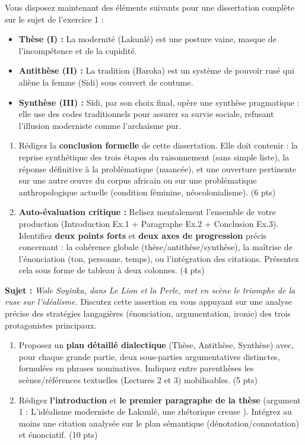 \documentclass[11pt]{article}
\begin{document}
\begin{exercice}
Vous disposez maintenant des éléments suivants pour une dissertation complète sur le sujet de l'exercice 1 :
\begin{itemize}
    \item \textbf{Thèse (I) :} La modernité (Lakunlé) est une posture vaine, masque de l'incompétence et de la cupidité.
    \item \textbf{Antithèse (II) :} La tradition (Baroka) est un système de pouvoir rusé qui aliène la femme (Sidi) sous couvert de coutume.
    \item \textbf{Synthèse (III) :} Sidi, par son choix final, opère une synthèse pragmatique : elle use des codes traditionnels pour assurer sa survie sociale, refusant l'illusion moderniste comme l'archaïsme pur.
\end{itemize}

\begin{enumerate}
    \item Rédigez la \textbf{conclusion formelle} de cette dissertation. Elle doit contenir : la reprise synthétique des trois étapes du raisonnement (sans simple liste), la réponse définitive à la problématique (nuancée), et une ouverture pertinente sur une autre œuvre du corpus africain ou sur une problématique anthropologique actuelle (condition féminine, néocolonialisme). (6 pts)
    \item \textbf{Auto-évaluation critique :} Relisez mentalement l'ensemble de votre production (Introduction Ex.1 + Paragraphe Ex.2 + Conclusion Ex.3). Identifiez \textbf{deux points forts} et \textbf{deux axes de progression} précis concernant : la cohérence globale (thèse/antithèse/synthèse), la maîtrise de l'énonciation (ton, personne, temps), ou l'intégration des citations. Présentez cela sous forme de tableau à deux colonnes. (4 pts)
\end{enumerate}
\end{exercice}

\begin{exercice}
\textbf{Sujet :} \og \textit{Wole Soyinka, dans Le Lion et la Perle, met en scène le triomphe de la ruse sur l'idéalisme.} \fg{} Discutez cette assertion en vous appuyant sur une analyse précise des stratégies langagières (énonciation, argumentation, ironie) des trois protagonistes principaux.

\begin{enumerate}
    \item Proposez un \textbf{plan détaillé dialectique} (Thèse, Antithèse, Synthèse) avec, pour chaque grande partie, deux sous-parties argumentatives distinctes, formulées en phrases nominatives. Indiquez entre parenthèses les scènes/références textuelles (Lectures 2 et 3) mobilisables. (5 pts)
    \item Rédigez \textbf{l'introduction} et \textbf{le premier paragraphe de la thèse} (argument 1 : \og L'idéalisme moderniste de Lakunlé, une rhétorique creuse \fg{}). Intégrez au moins une citation analysée sur le plan sémantique (dénotation/connotation) et énonciatif. (10 pts)
\end{enumerate}
\end{exercice}
\end{document}
